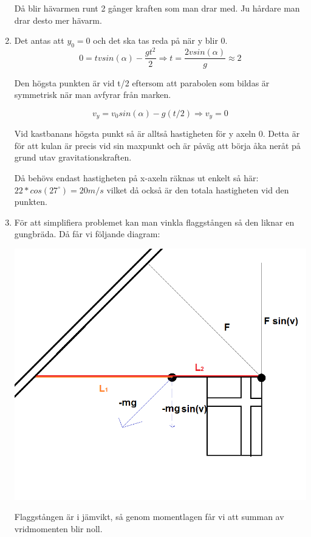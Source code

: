 \documentclass[a4paper,12pt]{article}
\begin{document}
\begin{enumerate}
            Då blir hävarmen runt 2 gånger kraften som man drar med. Ju hårdare man drar desto
            mer hävarm.

      \item Det antas att $y_0=0$ och det ska tas reda på när y blir 0.
            $$0=tvsin(\alpha)-\frac{gt^2}{2} \Rightarrow t=\frac{2vsin(\alpha)}{g}\approx 2$$

            Den högsta punkten är vid t/2 eftersom att parabolen som bildas är symmetrisk när
            man avfyrar från marken.

            $$v_y=v_0sin(\alpha)-g(t/2) \Rightarrow v_y=0$$

            Vid kastbanans högsta punkt så är alltså hastigheten för y axeln 0. Detta är för att
            kulan är precis vid sin maxpunkt och är påväg att börja åka neråt på grund utav
            gravitationskraften.

            Då behövs endast hastigheten på x-axeln räknas ut enkelt så här:
            $22*cos(27^\circ)=20 m/s$ vilket då också är den totala hastigheten vid den punkten.

      \item
            För att simplifiera problemet kan man vinkla flaggstången så den liknar
            en gungbräda. Då får vi följande diagram:

            \includegraphics[scale=0.55]{Figur2.png}

            Flaggstången är i jämvikt, så genom momentlagen får vi att summan av vridmomenten
            blir noll.


\end{enumerate}
\end{document}
